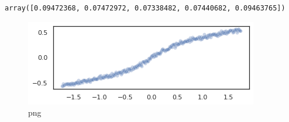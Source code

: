 \begin{verbatim}
array([0.09472368, 0.07472972, 0.07338482, 0.07440682, 0.09463765])
\end{verbatim}

\begin{figure}
\centering
\includegraphics{normality_and_linearity_violation_files/normality_and_linearity_violation_7_1.png}
\caption{png}
\end{figure}

\begin{Shaded}
\begin{Highlighting}[]

\end{Highlighting}
\end{Shaded}

